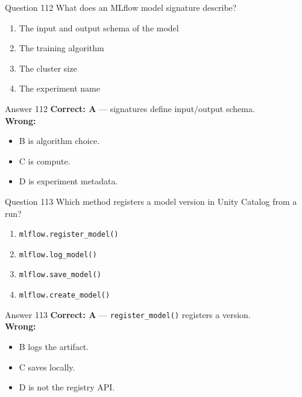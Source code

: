 \documentclass[aspectratio=169,11pt]{beamer}
\begin{document}
	\begin{frame}{Question 112}
		What does an MLflow model signature describe?
		\begin{enumerate}[label=\Alph*.]
			\item The input and output schema of the model
			\item The training algorithm
			\item The cluster size
			\item The experiment name
		\end{enumerate}
	\end{frame}
	\begin{frame}{Answer 112}
		\textbf{Correct: A} --- signatures define input/output schema.\\
		\vspace{0.5em}
		\textbf{Wrong:}
		\begin{itemize}
			\item B is algorithm choice.
			\item C is compute.
			\item D is experiment metadata.
		\end{itemize}
	\end{frame}
	
	\begin{frame}{Question 113}
		Which method registers a model version in Unity Catalog from a run?
		\begin{enumerate}[label=\Alph*.]
			\item \texttt{mlflow.register\_model()}
			\item \texttt{mlflow.log\_model()}
			\item \texttt{mlflow.save\_model()}
			\item \texttt{mlflow.create\_model()}
		\end{enumerate}
	\end{frame}
	\begin{frame}{Answer 113}
		\textbf{Correct: A} --- \texttt{register\_model()} registers a version.\\
		\vspace{0.5em}
		\textbf{Wrong:}
		\begin{itemize}
			\item B logs the artifact.
			\item C saves locally.
			\item D is not the registry API.
		\end{itemize}
	\end{frame}
	
\end{document}
